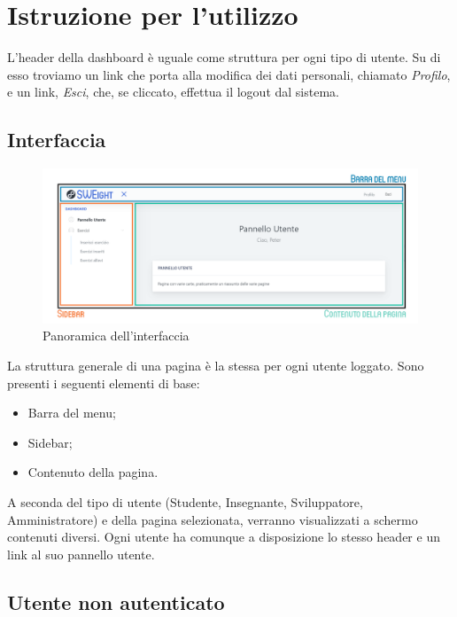 \section{Istruzione per l'utilizzo}
  L'header della {dashboard} è uguale come struttura per ogni tipo di utente. Su di esso troviamo un link che porta alla modifica dei dati personali, chiamato \textit{Profilo}, e un link, \textit{Esci}, che, se cliccato, effettua il logout dal sistema.



\subsection{Interfaccia}
    \begin{figure}[H]
        \centering
        \includegraphics[width=17cm]{sez/img/istruzioni/dashboardMod.png} 
        \caption{Panoramica dell'interfaccia}\label{fig:1}
    \end{figure}
  La struttura generale di una pagina è la stessa per ogni utente loggato. Sono presenti i seguenti elementi di base:
    \begin{itemize}
        \item Barra del menu;
        \item {Sidebar};
        \item Contenuto della pagina.
    \end{itemize}
 A seconda del tipo di utente (Studente, Insegnante, Sviluppatore, Amministratore) e della pagina selezionata, verranno visualizzati a schermo contenuti diversi. Ogni utente ha comunque a disposizione lo stesso header e un link al suo pannello utente.


\subsection{Utente non autenticato}
